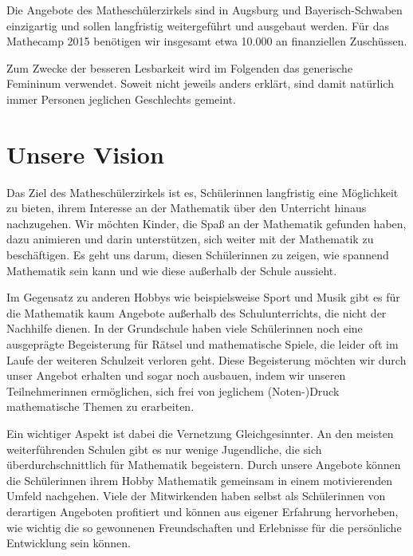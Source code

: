 \documentclass[12pt]{zettel}
\newcommand{\twopics}[2]{%
  \begin{figure}[b]%
    \vspace*{0.5cm}%
    \makebox[\textwidth][c]{%
      \texttt{[image: impressionen/\#1]}%
      \hspace*{1cm}%
      \texttt{[image: impressionen/\#2]}%
    }%
    \vspace*{-1cm}%
  \end{figure}
}
\begin{document}
Die Angebote des Matheschülerzirkels sind in Augsburg und Bayerisch-Schwaben einzigartig
und sollen langfristig weitergeführt und ausgebaut werden. Für das Mathecamp
2015 benötigen wir insgesamt etwa 10.000 \texteuro{} an finanziellen
Zuschüssen.

Zum Zwecke der besseren Lesbarkeit wird im Folgenden das generische Femininum verwendet. Soweit nicht jeweils anders erklärt, sind damit natürlich immer Personen jeglichen
Geschlechts gemeint.

\thispagestyle{empty}
\enlargethispage{4em}
\vspace{-2em}
\renewcommand\contentsname{}
\tableofcontents


\section{Unsere Vision}

Das Ziel des Matheschülerzirkels ist es, Schülerinnen langfristig eine Möglichkeit zu bieten, ihrem Interesse an der
Mathematik über den Unterricht hinaus nachzugehen. Wir möchten Kinder, die Spaß an der Mathematik gefunden haben, dazu animieren und darin unterstützen, sich weiter
mit der Mathematik zu beschäftigen. Es geht uns darum, diesen Schülerinnen zu zeigen, wie spannend Mathematik sein kann und wie diese außerhalb der Schule aussieht.

Im Gegensatz zu anderen Hobbys wie beispielsweise Sport und Musik gibt es für die Mathematik kaum Angebote außerhalb des Schulunterrichts, die nicht der Nachhilfe dienen.
In der Grundschule haben viele Schülerinnen noch eine ausgeprägte Begeisterung für 
Rätsel und mathematische Spiele, die leider oft im Laufe der weiteren
Schulzeit verloren geht. Diese Begeisterung möchten wir
durch unser Angebot erhalten und sogar noch ausbauen, indem wir
unseren Teilnehmerinnen ermöglichen, sich frei von jeglichem
(Noten-)Druck mathematische Themen zu erarbeiten.

\twopics{auftakt1}{auftakt2}

Ein wichtiger Aspekt ist dabei die Vernetzung Gleichgesinnter. An
den meisten weiterführenden Schulen gibt es nur wenige Jugendliche, die sich über\-durch\-schnitt\-lich für Mathematik begeistern. Durch unsere Angebote können die
Schülerinnen ihrem Hobby Mathematik gemeinsam in einem motivierenden Umfeld nachgehen. Viele der Mitwirkenden haben selbst als Schülerinnen von derartigen Angeboten
profitiert und können aus eigener Erfahrung hervorheben, wie wichtig die so gewonnenen Freundschaften und Erlebnisse für die persönliche Entwicklung sein können.
\end{document}
